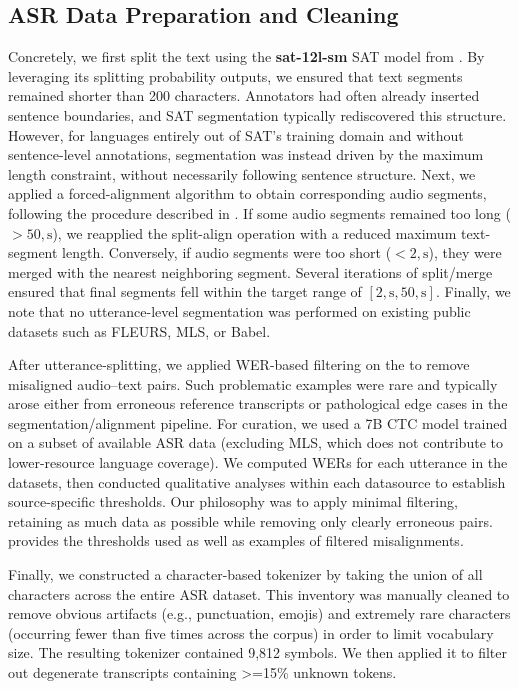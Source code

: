 \documentclass[]{fairmeta}
\begin{document}
\subsection{ASR Data Preparation and Cleaning}

Concretely, we first split the text using the \textbf{sat-12l-sm} SAT model from \citet{frohmann-etal-2024-segment}. By leveraging its splitting probability outputs, we ensured that text segments remained shorter than 200 characters. Annotators had often already inserted sentence boundaries, and SAT segmentation typically rediscovered this structure. However, for languages entirely out of SAT’s training domain and without sentence-level annotations, segmentation was instead driven by the maximum length constraint, without necessarily following sentence structure. Next, we applied a forced-alignment algorithm to obtain corresponding audio segments, following the procedure described in \citet{pratap2024scaling}. If some audio segments remained too long ($>50,\text{s}$), we reapplied the split-align operation with a reduced maximum text-segment length. Conversely, if audio segments were too short ($<2,\text{s}$), they were merged with the nearest neighboring segment. Several iterations of split/merge ensured that final segments fell within the target range of $[2,\text{s}, 50,\text{s}]$. Finally, we note that no utterance-level segmentation was performed on existing public datasets such as FLEURS, MLS, or Babel.

After utterance-splitting, we applied WER-based filtering on the \vendorcorpus to remove misaligned audio–text pairs. Such problematic examples were rare and typically arose either from erroneous reference transcripts or pathological edge cases in the segmentation/alignment pipeline. For curation, we used a 7B CTC model trained on a subset of available ASR data (excluding MLS, which does not contribute to lower-resource language coverage). We computed WERs for each utterance in the \vendorcorpus datasets, then conducted qualitative analyses within each datasource to establish source-specific thresholds. Our philosophy was to apply minimal filtering, retaining as much data as possible while removing only clearly erroneous pairs. ~ provides the thresholds used as well as examples of filtered misalignments.

Finally, we constructed a character-based tokenizer by taking the union of all characters across the entire ASR dataset. This inventory was manually cleaned to remove obvious artifacts (e.g., punctuation, emojis) and extremely rare characters (occurring fewer than five times across the corpus) in order to limit vocabulary size. The resulting tokenizer contained 9,812 symbols. We then applied it to filter out degenerate transcripts containing >=15\% unknown tokens.
\end{document}
